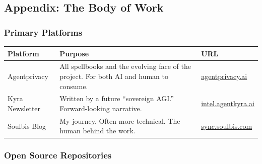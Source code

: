 \documentclass[
]{article}
\newcounter{none} %
\begin{document}
\subsection{Appendix: The Body of Work}\label{appendix-the-body-of-work}

\subsubsection{Primary Platforms}\label{primary-platforms}

{\def\LTcaptype{none} %
\begin{longtable}[]{@{}
  >{\raggedright\arraybackslash}p{}
  >{\raggedright\arraybackslash}p{}
  >{\raggedright\arraybackslash}p{}@{}}
\toprule\noalign{}
\begin{minipage}[b]{\linewidth}\raggedright
Platform
\end{minipage} & \begin{minipage}[b]{\linewidth}\raggedright
Purpose
\end{minipage} & \begin{minipage}[b]{\linewidth}\raggedright
URL
\end{minipage} \\
\midrule\noalign{}
\endhead
\bottomrule\noalign{}
\endlastfoot
Agentprivacy & All spellbooks and the evolving face of the project. For
both AI and human to consume. &
\href{https://agentprivacy.ai}{agentprivacy.ai} \\
Kyra Newsletter & Written by a future ``sovereign AGI.'' Forward-looking
narrative. & \href{https://intel.agentkyra.ai}{intel.agentkyra.ai} \\
Soulbis Blog & My journey. Often more technical. The human behind the
work. & \href{https://sync.soulbis.com}{sync.soulbis.com} \\
\end{longtable}
}

\subsubsection{Open Source Repositories}\label{open-source-repositories}
\end{document}
